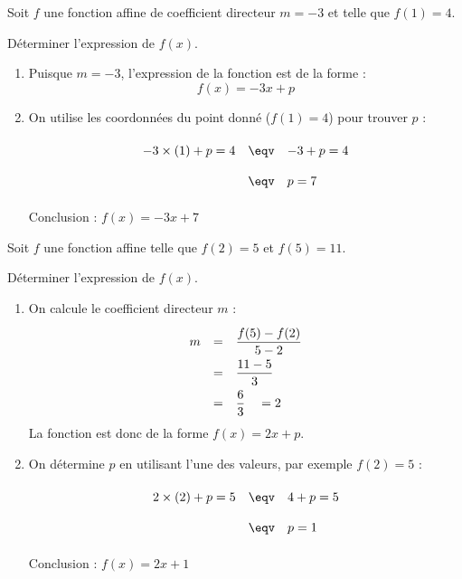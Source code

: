 \begin{methode}
	Soit $f$ une fonction affine de coefficient directeur $m = -3$ et telle que $f(1) = 4$.

	Déterminer l'expression de $f(x)$.
	\begin{correction}
		\nline
		\begin{enumerate}
			\item Puisque $m = -3$, l'expression de la fonction est de la forme :
			      \[
				      f(x) = -3x + p
			      \]
			\item On utilise les coordonnées du point donné ($f(1) = 4$) pour trouver $p$ :
			      \[
				      \begin{array}{rcl}
					      -3\times (1) + p = 4 & \eqv & -3 + p = 4 \\
					                           & \eqv & p = 7
				      \end{array}
			      \]

			      Conclusion : $f(x) = -3x + 7$
		\end{enumerate}
	\end{correction}
\end{methode}

\newpage

\begin{methode}
	Soit $f$ une fonction affine telle que $f(2) = 5$ et $f(5) = 11$.

	Déterminer l'expression de $f(x)$.
	\begin{correction}
		\nline
		\begin{enumerate}
			\item On calcule le coefficient directeur $m$ :
			      \[
				      \def\arraystretch{2}
				      \begin{array}{rcl}
					      m & = & \dfrac{f(5) - f(2)}{5 - 2} \\
					        & = & \dfrac{11 - 5}{3}          \\
					        & = & \dfrac{6}{3} \quad = 2
				      \end{array}
			      \]
			      La fonction est donc de la forme $f(x) = 2x + p$.
			\item On détermine $p$ en utilisant l'une des valeurs, par exemple $f(2) = 5$ :
			      \[
				      \begin{array}{rcl}
					      2\times (2) + p = 5 & \eqv & 4 + p = 5 \\
					                          & \eqv & p = 1
				      \end{array}
			      \]

			      Conclusion : $f(x) = 2x + 1$
		\end{enumerate}
	\end{correction}
\end{methode}

